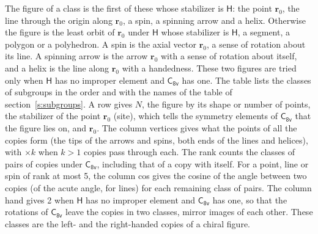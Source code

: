 \documentclass[10pt,a4paper]{article}
\numberwithin{equation}{section}
\newcommand{\grp}[1]{\mathsf{#1}}
\newcommand{\pointr}{\mathbf{r}}
\begin{document}
\leavevmode\label{n:head.figure}The figure of a class is the first of these whose stabilizer is $\grp{H}$: the point $\pointr_0$, the line through the origin along $\pointr_0$, a spin, a spinning arrow and a helix. Otherwise the figure is the least orbit of $\pointr_0$ under $\grp{H}$ whose stabilizer is $\grp{H}$, a segment, a polygon or a polyhedron. A spin is the axial vector $\pointr_0$, a sense of rotation about its line. A spinning arrow is the arrow $\pointr_0$ with a sense of rotation about itself, and a helix is the line along $\pointr_0$ with a handedness. These two figures are tried only when $\grp{H}$ has no improper element and $\grp{C_{8v}}$ has one. The table lists the classes of subgroups in the order and with the names of the table of section~\ref{s:subgroups}. \label{n:head.site}A row gives $N$, the figure by its shape or number of points, the stabilizer of the point $\pointr_0$ (site), which tells the symmetry elements of $\grp{C_{8v}}$ that the figure lies on, and $\pointr_0$. \label{n:head.vertices}The column vertices gives what the points of all the copies form (the tips of the arrows and spins, both ends of the lines and helices), with ${\times}k$ when $k > 1$ copies pass through each. \label{n:head.rank}The rank counts the classes of pairs of copies under $\grp{C_{8v}}$, including that of a copy with itself. \label{n:head.cos}For a point, line or spin of rank at most 5, the column cos gives the cosine of the angle between two copies (of the acute angle, for lines) for each remaining class of pairs. \label{n:head.hand}The column hand gives 2 when $\grp{H}$ has no improper element and $\grp{C_{8v}}$ has one, so that the rotations of $\grp{C_{8v}}$ leave the copies in two classes, mirror images of each other. These classes are the left- and the right-handed copies of a chiral figure.
\end{document}
